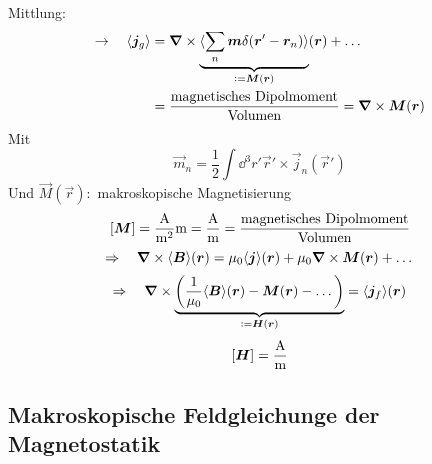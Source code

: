\\
Mittlung:
\begin{align*}
\rightarrow \quad \langle \vec{j}_g \rangle &= \vabla \times \ub{\langle \sum_n \vec{m} \delta(\vec{r}' - \vec{r}_n) \rangle}_{\defeq \vec{M}(\vec{r})} (\vec{r}) + \dots \\
&= \frac{\tx{magnetisches Dipolmoment}}{\tx{Volumen}} = \vabla \times \vec{M}(\vec{r})
\end{align*}
Mit
$$ \vec{m}_n = \frac{1}{2} \int \dd^3 r' \vec{r}' \times \vec{j}_n(\vec{r}') $$
Und $ \vec{M} (\vec{r}) : $ makroskopische Magnetisierung
\begin{equation*}
\left[\bm{M}\right] = \frac{\textrm{A}}{\textrm{m}^2} \textrm{m} = \frac{\textrm{A}}{\textrm{m}} = \frac{\textrm{magnetisches Dipolmoment}}{\textrm{Volumen}}
\end{equation*}
\begin{equation*}
\Rightarrow \quad \bm{\nabla} \times \langle \bm{B} \rangle (\bm{r}) = \mu_0 \langle \bm{j} \rangle (\bm{r}) + \mu_0 \bm{\nabla} \times \bm{M}(\bm{r}) + \dots
\end{equation*}
\begin{equation*}
\Rightarrow \quad \vabla \times \ub{\left(\frac{1}{\mu_0} \langle \vec{B} \rangle (\vec{r})  - \vec{M} (\vec{r}) - \dots \right)}_{\defeq \vec{H}(\vec{r})} = \langle \vec{j}_f \rangle (\vec{r})
\end{equation*}
\begin{equation*}
\left[\bm{H}\right] = \frac{\textrm{A}}{\textrm{m}}
\end{equation*}

\subsection{Makroskopische Feldgleichunge der Magnetostatik}

